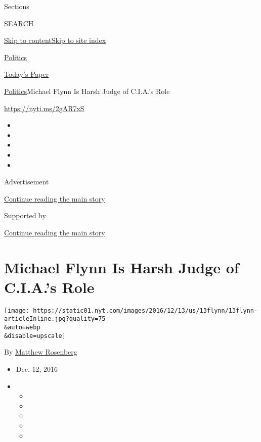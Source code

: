 Sections

SEARCH

\protect\hyperlink{site-content}{Skip to
content}\protect\hyperlink{site-index}{Skip to site index}

\href{https://www.nytimes.com/section/politics}{Politics}

\href{https://myaccount.nytimes.com/auth/login?response_type=cookie\&client_id=vi}{}

\href{https://www.nytimes.com/section/todayspaper}{Today's Paper}

\href{/section/politics}{Politics}\textbar{}Michael Flynn Is Harsh Judge
of C.I.A.'s Role

\url{https://nyti.ms/2gAR7xS}

\begin{itemize}
\item
\item
\item
\item
\item
\end{itemize}

Advertisement

\protect\hyperlink{after-top}{Continue reading the main story}

Supported by

\protect\hyperlink{after-sponsor}{Continue reading the main story}

\hypertarget{michael-flynn-is-harsh-judge-of-cias-role}{%
\section{Michael Flynn Is Harsh Judge of C.I.A.'s
Role}\label{michael-flynn-is-harsh-judge-of-cias-role}}

\texttt{[image: https://static01.nyt.com/images/2016/12/13/us/13flynn/13flynn-articleInline.jpg?quality=75\\\&auto=webp\\\&disable=upscale]}

By \href{http://www.nytimes.com/by/matthew-rosenberg}{Matthew Rosenberg}

\begin{itemize}
\item
  Dec. 12, 2016
\item
  \begin{itemize}
  \item
  \item
  \item
  \item
  \item
  \end{itemize}
\end{itemize}

